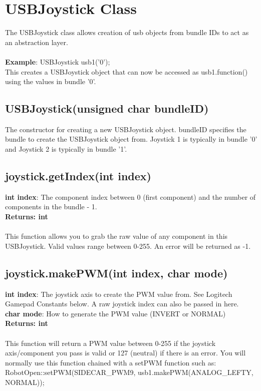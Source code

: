 \documentclass[11pt]{article} %
\begin{document}
\section{USBJoystick Class}

The USBJoystick class allows creation of usb objects from bundle IDs to act as an abstraction layer.\\\\ \textbf{Example}: USBJoystick usb1('0');\\
This creates a USBJoystick object that can now be accessed as usb1.function() using the values in bundle '0'.

\subsection{USBJoystick(unsigned char bundleID)}
The constructor for creating a new USBJoystick object. bundleID specifies the bundle to create the USBJoystick object from. Joystick 1 is typically in bundle '0' and Joystick 2 is typically in bundle '1'.
\subsection{joystick.getIndex(int index)}
\textbf{int index}: The component index between 0 (first component) and the number of components in the bundle - 1.\\
\textbf{Returns: int}\\\\
This function allows you to grab the raw value of any component in this USBJoystick. Valid values range between 0-255. An error will be returned as -1.
\subsection{joystick.makePWM(int index, char mode)}
\textbf{int index}: The joystick axis to create the PWM value from. See Logitech Gamepad Constants below. A raw joystick index can also be passed in here.\\
\textbf{char mode}: How to generate the PWM value (INVERT or NORMAL)\\
\textbf{Returns: int}\\\\
This function will return a PWM value between 0-255 if the joystick axis/component you pass is valid or 127 (neutral) if there is an error. You will normally use this function chained with a setPWM function such as:\\
RobotOpen::setPWM(SIDECAR\_PWM9, usb1.makePWM(ANALOG\_LEFTY, NORMAL));
\end{document}
